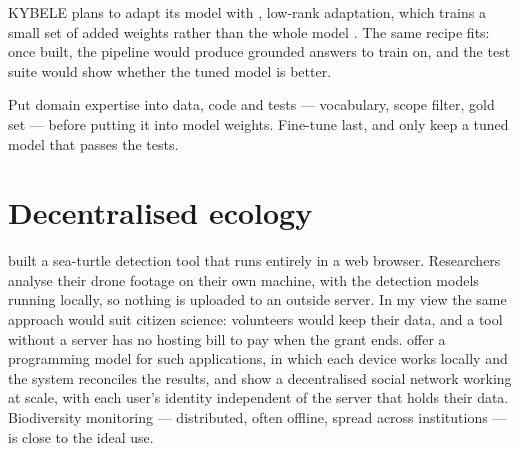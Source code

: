 KYBELE plans to adapt its model with , low-rank adaptation, which
trains a small set of added weights rather than the whole model
\parencite{hu2021lora}. The same recipe fits: once built, the pipeline would
produce grounded answers to train on, and the test suite would show whether
the tuned model is better.

\begin{keypoint}
Put domain expertise into data, code and tests --- vocabulary, scope filter,
gold set --- before putting it into model weights. Fine-tune last, and only keep
a tuned model that passes the tests.
\end{keypoint}

\section{Decentralised ecology}

\textcite{placitelli2026seaturtle} built a sea-turtle detection tool that runs
entirely in a web browser. Researchers analyse their drone footage on their own
machine, with the detection models running locally, so nothing is uploaded to
an outside server. In my view the same approach would suit citizen science:
volunteers would keep their data, and a tool without a server has no hosting
bill to pay when the grant ends. \textcite{haas2025corda} offer a programming model for
such applications, in which each device works locally and the system reconciles
the results, and \textcite{kleppmann2024bluesky} show a decentralised social
network working at scale, with each user's identity independent of the server
that holds their data. Biodiversity monitoring --- distributed, often offline,
spread across institutions --- is close to the ideal use.

